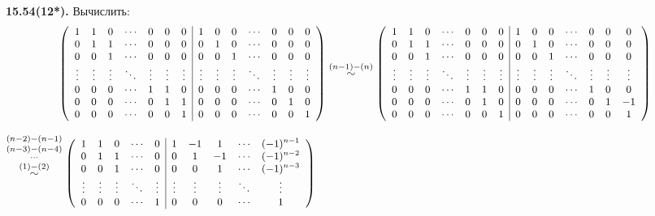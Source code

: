 \documentclass[a4paper,12pt]{article} %
\begin{document}
\noindent\textbf{15.54(12*).}
Вычислить:
\begin{align*}\small
	\left(
		\begin{array}{ccccccc|ccccccc}
		1&1&0&\cdots&0&0&0					&1&0&0&\cdots&0&0&0\\
		0&1&1&\cdots&0&0&0    				&0&1&0&\cdots&0&0&0\\
		0&0&1&\cdots&0&0&0					&0&0&1&\cdots&0&0&0\\
		\vdots&\vdots&\vdots&\ddots&\vdots&\vdots&\vdots
		&\vdots&\vdots&\vdots&\ddots&\vdots&\vdots&\vdots\\
		0&0&0&\cdots&1&1&0     				&0&0&0&\cdots&1&0&0\\
		0&0&0&\cdots&0&1&1					&0&0&0&\cdots&0&1&0\\
		0&0&0&\cdots&0&0&1					&0&0&0&\cdots&0&0&1\\
		\end{array}
	\right)
	\stackrel{(n-1)-(n)}{\sim}
	\left(
	\begin{array}{ccccccc|ccccccc}
	1&1&0&\cdots&0&0&0					&1&0&0&\cdots&0&0&0\\
	0&1&1&\cdots&0&0&0    				&0&1&0&\cdots&0&0&0\\
	0&0&1&\cdots&0&0&0					&0&0&1&\cdots&0&0&0\\
	\vdots&\vdots&\vdots&\ddots&\vdots&\vdots&\vdots
	&\vdots&\vdots&\vdots&\ddots&\vdots&\vdots&\vdots\\
	0&0&0&\cdots&1&1&0     				&0&0&0&\cdots&1&0&0\\
	0&0&0&\cdots&0&1&0					&0&0&0&\cdots&0&1&-1\\
	0&0&0&\cdots&0&0&1					&0&0&0&\cdots&0&0&1\\
	\end{array}
	\right)
\end{align*}

$\small
	\stackrel{(n-2)-(n-1)}{\stackrel{(n-3)-(n-4)}{\stackrel{\cdots}{\stackrel{(1)-(2)}{\sim}}}}
	\left(
	\begin{array}{ccccc|ccccc}
	1&1&0&\cdots&0					&1&-1&1&\cdots&(-1)^{n-1}\\
	0&1&1&\cdots&0    				&0&1&-1&\cdots&(-1)^{n-2}\\
	0&0&1&\cdots&0					&0&0&1&\cdots&(-1)^{n-3}\\
	\vdots&\vdots&\vdots&\ddots&\vdots&\vdots&\vdots
	&\vdots&\ddots&\vdots\\
	0&0&0&\cdots&1     				&0&0&0&\cdots&1\\
	\end{array}
	\right)
$\\\\
\end{document}
